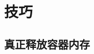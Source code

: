 \chapter{技巧}
\section{真正释放容器内存}
\inputminted{cpp}{\source/tricks/truly-release-container-space.cpp}
